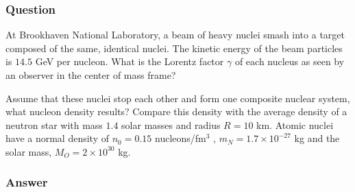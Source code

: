 \subsubsection{Question}
At Brookhaven National Laboratory, a beam of heavy nuclei smash into a target composed of the same, identical nuclei. The kinetic energy of the beam particles is $14.5$ GeV per nucleon. What is the Lorentz factor $\gamma$ of each nucleus as seen by an observer in the center of mass frame?

Assume that these nuclei stop each other and form one composite nuclear system, what nucleon density results? Compare this density with the average density of a neutron star with mass $1.4$ solar masses and radius $R = 10$ km. Atomic nuclei have a normal density of $n_0 = 0.15$ nucleons/fm$^3$ , $m_N = 1.7\times10^{-27}$ kg and the solar mass, $M_O = 2\times10^{30}$ kg.
\subsubsection{Answer}

